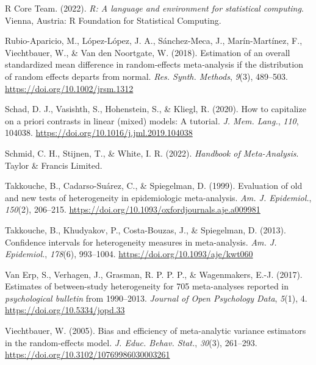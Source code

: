 \documentclass[
  man,floatsintext]{apa6}
\newlength{\cslhangindent}
\newlength{\cslentryspacingunit} %
\newenvironment{CSLReferences}[2] %
 {%
  \setlength{\parindent}{0pt}
  \ifodd #1
  \let\oldpar\par
  \def\par{\hangindent=\cslhangindent\oldpar}
  \fi
  \setlength{\parskip}{#2\cslentryspacingunit}
 }%
 {}
\begin{document}
\begin{CSLReferences}{1}{0}
\leavevmode{}%
R Core Team. (2022). \emph{R: A language and environment for statistical computing}. Vienna, Austria: R Foundation for Statistical Computing.

\leavevmode{}%
Rubio-Aparicio, M., López-López, J. A., Sánchez-Meca, J., Marín-Martínez, F., Viechtbauer, W., \& Van den Noortgate, W. (2018). Estimation of an overall standardized mean difference in random‐effects meta‐analysis if the distribution of random effects departs from normal. \emph{Res. Synth. Methods}, \emph{9}(3), 489--503. \url{https://doi.org/10.1002/jrsm.1312}

\leavevmode{}%
Schad, D. J., Vasishth, S., Hohenstein, S., \& Kliegl, R. (2020). How to capitalize on a priori contrasts in linear (mixed) models: A tutorial. \emph{J. Mem. Lang.}, \emph{110}, 104038. \url{https://doi.org/10.1016/j.jml.2019.104038}

\leavevmode{}%
Schmid, C. H., Stijnen, T., \& White, I. R. (2022). \emph{Handbook of {Meta-Analysis}}. Taylor \& Francis Limited.

\leavevmode{}%
Takkouche, B., Cadarso-Suárez, C., \& Spiegelman, D. (1999). Evaluation of old and new tests of heterogeneity in epidemiologic meta-analysis. \emph{Am. J. Epidemiol.}, \emph{150}(2), 206--215. \url{https://doi.org/10.1093/oxfordjournals.aje.a009981}

\leavevmode{}%
Takkouche, B., Khudyakov, P., Costa-Bouzas, J., \& Spiegelman, D. (2013). Confidence intervals for heterogeneity measures in meta-analysis. \emph{Am. J. Epidemiol.}, \emph{178}(6), 993--1004. \url{https://doi.org/10.1093/aje/kwt060}

\leavevmode{}%
Van Erp, S., Verhagen, J., Grasman, R. P. P. P., \& Wagenmakers, E.-J. (2017). Estimates of between-study heterogeneity for 705 meta-analyses reported in \emph{psychological bulletin} from 1990--2013. \emph{Journal of Open Psychology Data}, \emph{5}(1), 4. \url{https://doi.org/10.5334/jopd.33}

\leavevmode{}%
Viechtbauer, W. (2005). Bias and efficiency of meta-analytic variance estimators in the random-effects model. \emph{J. Educ. Behav. Stat.}, \emph{30}(3), 261--293. \url{https://doi.org/10.3102/10769986030003261}


\end{CSLReferences}
\end{document}
